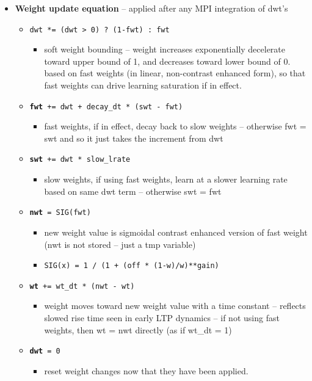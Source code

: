 \begin{itemize}
\item {\bf Weight update equation} -- applied after any MPI integration of dwt's
  \begin{itemize}
  \item {\tt  dwt *= (dwt > 0) ? (1-fwt) : fwt}
    \begin{itemize}
    \item soft weight bounding -- weight increases exponentially decelerate toward upper bound of 1, and decreases toward lower bound of 0.  based on fast weights (in linear, non-contrast enhanced form), so that fast weights can drive learning saturation if in effect.
    \end{itemize}
  \item {\tt  {\bf fwt} += dwt + decay\_dt * (swt - fwt) }
    \begin{itemize}
    \item fast weights, if in effect, decay back to slow weights -- otherwise fwt = swt and so it just takes the increment from dwt
    \end{itemize}
  \item {\tt  {\bf swt} += dwt * slow\_lrate }
    \begin{itemize}
    \item slow weights, if using fast weights, learn at a slower learning rate based on same dwt term -- otherwise swt = fwt
    \end{itemize}
  \item {\tt  {\bf nwt} = SIG(fwt) }
    \begin{itemize}
    \item new weight value is sigmoidal contrast enhanced version of fast weight (nwt is not stored -- just a tmp variable)
    \item {\tt SIG(x) = 1 / (1 + (off * (1-w)/w)**gain)}
    \end{itemize}
  \item {\tt  {\bf wt} += wt\_dt * (nwt - wt) }
    \begin{itemize}
    \item weight moves toward new weight value with a time constant -- reflects slowed rise time seen in early LTP dynamics -- if not using fast weights, then wt = nwt directly (as if wt\_dt = 1)
    \end{itemize}
  \item {\tt  {\bf dwt} = 0 }
    \begin{itemize}
    \item reset weight changes now that they have been applied.
    \end{itemize}
  \end{itemize}
\end{itemize}

